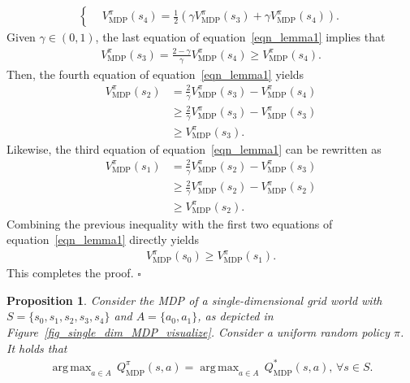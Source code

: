 \documentclass[10pt]{article}
\def\eqref#1{equation~\ref{#1}}
\DeclareMathOperator*{\argmax}{arg\,max}
\newtheorem{proposition}{Proposition}
\newenvironment{myproof}{{\noindent\it Proof. }}{\hfill $\square$ \par}
\begin{document}
\begin{myproof}
\begin{align}
\begin{cases}
    &\!\!\!\!\!\! V_\text{MDP}^{\pi}(s_4) = \frac{1}{2} \left( \gamma V_\text{MDP}^{\pi}(s_3) +  \gamma V_\text{MDP}^{\pi}(s_4) \right).
    \end{cases}
    \end{align}
Given $\gamma \in (0, 1)$, the last equation of \eqref{eqn_lemma1} implies that
\begin{align}
    V_\text{MDP}^{\pi}(s_3) = \frac{2-\gamma}{\gamma} V_\text{MDP}^{\pi}(s_4) \geq V_\text{MDP}^{\pi}(s_4).
\end{align}
Then, the fourth equation of \eqref{eqn_lemma1} yields
\begin{align}
    V_\text{MDP}^{\pi}(s_2) &= \frac{2}{\gamma} V_\text{MDP}^{\pi}(s_3) - V_\text{MDP}^{\pi}(s_4) \\
    &\geq \frac{2}{\gamma} V_\text{MDP}^{\pi}(s_3) - V_\text{MDP}^{\pi}(s_3) \\
    &\geq V_\text{MDP}^{\pi}(s_3).
\end{align}
Likewise, the third equation of \eqref{eqn_lemma1} can be rewritten as
\begin{align}
    V_\text{MDP}^{\pi}(s_1) &= \frac{2}{\gamma} V_\text{MDP}^{\pi}(s_2) - V_\text{MDP}^{\pi}(s_3) \\
    &\geq \frac{2}{\gamma} V_\text{MDP}^{\pi}(s_2) - V_\text{MDP}^{\pi}(s_2) \\
    &\geq V_\text{MDP}^{\pi}(s_2).
\end{align}
Combining the previous inequality with the first two equations of \eqref{eqn_lemma1} directly yields
\begin{align}
    V_\text{MDP}^{\pi}(s_0) \geq V_\text{MDP}^{\pi}(s_1).
\end{align}
This completes the proof.
\end{myproof}
\begin{proposition}\label{proposition_single_MDP}
    Consider the MDP of a single-dimensional grid world with $S=\{s_0, s_1, s_2, s_3, s_4\}$ and $A=\{a_0, a_1\}$, as depicted in Figure~\ref{fig_single_dim_MDP_visualize}. Consider a uniform random policy $\pi$. It holds that
    \begin{align}
        \argmax_{ a \in A} \, Q_\text{MDP}^\pi(s, a) = \argmax_{a \in A} \, Q_\text{MDP}^*(s, a), \, \forall s \in S.
    \end{align}
\end{proposition}
\end{document}

